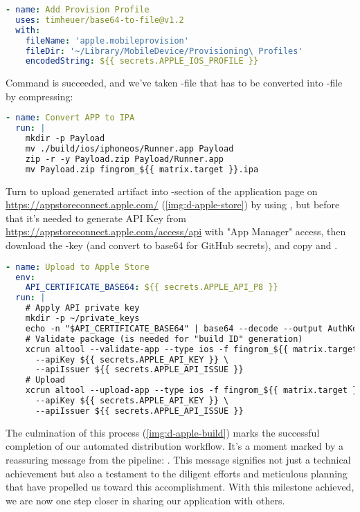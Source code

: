 \begin{lstlisting}[language=yaml]
- name: Add Provision Profile
  uses: timheuer/base64-to-file@v1.2
  with:
    fileName: 'apple.mobileprovision'
    fileDir: '~/Library/MobileDevice/Provisioning\ Profiles'
    encodedString: ${{ secrets.APPLE_IOS_PROFILE }}
\end{lstlisting}

\noindent Command  is succeeded, and we've taken -file that has to be 
converted into -file by compressing:

\begin{lstlisting}[language=yaml]
- name: Convert APP to IPA
  run: |
    mkdir -p Payload
    mv ./build/ios/iphoneos/Runner.app Payload
    zip -r -y Payload.zip Payload/Runner.app
    mv Payload.zip fingrom_${{ matrix.target }}.ipa
\end{lstlisting}


\noindent Turn to upload generated artifact into -section of the application page on 
\href{https://appstoreconnect.apple.com/}{https://appstoreconnect.apple.com/} (\cref{img:d-apple-store}) by using 
, but before that it's needed to generate API Key from 
\href{https://appstoreconnect.apple.com/access/api}{https://appstoreconnect.apple.com/access/api} with "App Manager"
access, then download the -key (and convert to base64 for GitHub secrets), and copy  and .

\begin{lstlisting}[language=yaml]
- name: Upload to Apple Store
  env:
    API_CERTIFICATE_BASE64: ${{ secrets.APPLE_API_P8 }}
  run: |
    # Apply API private key
    mkdir -p ~/private_keys
    echo -n "$API_CERTIFICATE_BASE64" | base64 --decode --output AuthKey_${{ secrets.APPLE_API_KEY }}.p8
    # Validate package (is needed for "build ID" generation)
    xcrun altool --validate-app --type ios -f fingrom_${{ matrix.target }}.ipa \ 
      --apiKey ${{ secrets.APPLE_API_KEY }} \
      --apiIssuer ${{ secrets.APPLE_API_ISSUE }}
    # Upload
    xcrun altool --upload-app --type ios -f fingrom_${{ matrix.target }}.ipa \
      --apiKey ${{ secrets.APPLE_API_KEY }} \
      --apiIssuer ${{ secrets.APPLE_API_ISSUE }}
\end{lstlisting}

\noindent The culmination of this process (\cref{img:d-apple-build}) marks the successful completion of our automated 
distribution workflow. It's a moment marked by a reassuring message from the pipeline: . 
This message signifies not just a technical achievement but also a testament to the diligent efforts and meticulous 
planning that have propelled us toward this accomplishment. With this milestone achieved, we are now one step closer 
in sharing our application with others.

